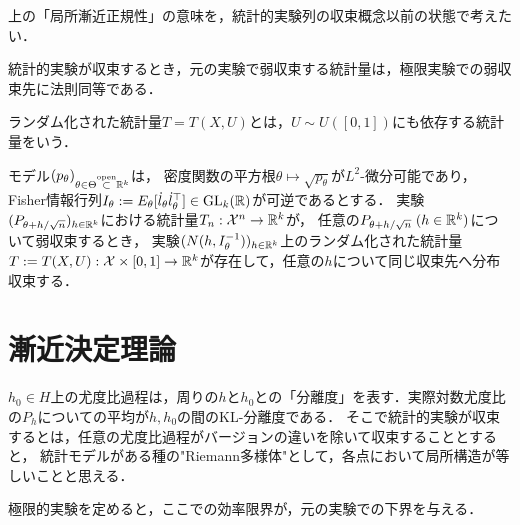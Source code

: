 \documentclass[uplatex,dvipdfmx]{jsreport}
\begin{document}
\begin{tcolorbox}[colframe=ForestGreen, colback=ForestGreen!10!white,breakable,colbacktitle=ForestGreen!40!white,coltitle=black,fonttitle=\bfseries\sffamily,
title=]
    上の「局所漸近正規性」の意味を，統計的実験列の収束概念以前の状態で考えたい．

\end{tcolorbox}

\begin{discussion}
    統計的実験が収束するとき，元の実験で弱収束する統計量は，極限実験での弱収束先に法則同等である．
\end{discussion}

\begin{definition}
    ランダム化された統計量$T=T(X,U)$とは，$U\sim U([0,1])$にも依存する統計量をいう．
\end{definition}

\begin{theorem}[局所漸近正規性の十分条件]
    モデル$(p_\theta)_{\theta\in\Theta\overset{\mathrm{open}}{\subset}\mathbb{R}^k}$は，
    密度関数の平方根$\theta\mapsto\sqrt{p_\theta}$が$L^2$-微分可能であり，Fisher情報行列$I_\theta:=E_\theta[\dot{l}_\theta\dot{l}_\theta^\top]\in\mathrm{GL}_k(\mathbb{R})$が可逆であるとする．
    実験$(P_{\theta+h/\sqrt{n}})_{h\in\mathbb{R}^k}$における統計量$T_n:\mathcal{X}^n\to\mathbb{R}^k$が，
    任意の$P_{\theta+h/\sqrt{n}}\;(h\in\mathbb{R}^k)$について弱収束するとき，
    実験$(N(h,I^{-1}_{\theta}))_{h\in\mathbb{R}^k}$上のランダム化された統計量$T:=T(X,U):\mathcal{X}\times[0,1]\to\mathbb{R}^k$が存在して，任意の$h$について同じ収束先へ分布収束する．
\end{theorem}

\section{漸近決定理論}

\begin{tcolorbox}[colframe=ForestGreen, colback=ForestGreen!10!white,breakable,colbacktitle=ForestGreen!40!white,coltitle=black,fonttitle=\bfseries\sffamily,
title=]
    $h_0\in H$上の尤度比過程は，周りの$h$と$h_0$との「分離度」を表す．実際対数尤度比の$P_h$についての平均が$h,h_0$の間のKL-分離度である．
    そこで統計的実験が収束するとは，任意の尤度比過程がバージョンの違いを除いて収束することとすると，
    統計モデルがある種の"Riemann多様体"として，各点において局所構造が等しいことと思える．

    極限的実験を定めると，ここでの効率限界が，元の実験での下界を与える．
\end{tcolorbox}
\end{document}
